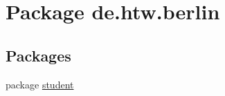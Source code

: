 \hypertarget{namespacede_1_1htw_1_1berlin}{\section{Package de.\-htw.\-berlin}
\label{namespacede_1_1htw_1_1berlin}
}
\subsection*{Packages}
\begin{DoxyCompactItemize}
\item 
package \hyperlink{namespacede_1_1htw_1_1berlin_1_1student}{student}
\end{DoxyCompactItemize}
